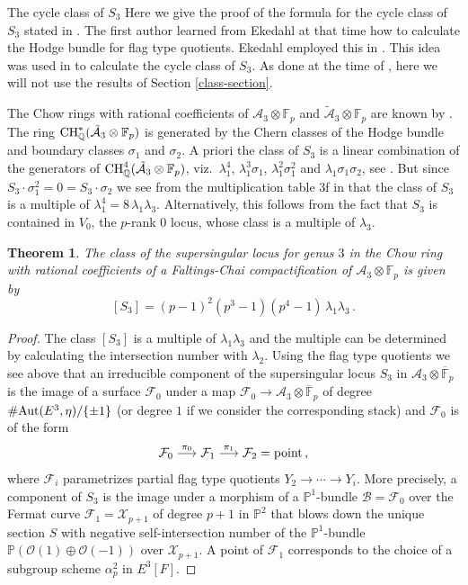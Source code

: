 \documentclass[11pt]{amsart}
\numberwithin{equation}{section}
\newcommand{\FF}{\mathbb F}
\newcommand{\PP}{\mathbb P}
\newcommand{\QQ}{\mathbb Q}
\newcommand{\A}{\mathcal A}
\newcommand\langepijl[1]{\buildrel {#1} \over \longrightarrow}
\newtheorem{theorem}{Theorem}[section]
\theoremstyle{definition}
\theoremstyle{remark}
\begin{document}
\begin{section}{The cycle class of $S_3$}
Here we give the proof of the formula for the cycle class of $S_3$
stated in \cite[Thm. 11.3]{vdG1}. The first author learned from Ekedahl at that time
how to calculate the Hodge bundle for flag type quotients. Ekedahl
employed this in \cite[Cor. 3.4]{Ekedahl1985}. This idea was used 
in \cite{vdG1} to calculate the cycle class of $S_3$. As done 
at the time of \cite{vdG1}, here we will not use the results of Section \ref{class-section}.

The Chow rings with rational coefficients
of ${\A}_3\otimes {\FF}_p$ and $\tilde{\A}_3\otimes {\FF}_p$ 
are known by \cite{vdG2}. The ring
${\rm CH}_{\QQ}^*(\tilde{\A}_3 \otimes {\FF}_p)$ is generated by the Chern classes
of the Hodge bundle and boundary classes $\sigma_1$ and $\sigma_2$.
A priori the class of $S_3$  is a linear
combination of the generators of ${\rm CH}_{\QQ}^4({\tilde{\A}_3\otimes {\FF}_p})$, viz.\
$\lambda_1^4$, $\lambda_1^3\sigma_1$,
$\lambda_1^2\sigma_1^2$ and $\lambda_1\sigma_1\sigma_2$, see \cite{vdG2}. But since
$S_3\cdot \sigma_1^2=0=S_3\cdot \sigma_2$ we see from the multiplication
table 3f in \cite[p.\ 765]{vdG2} that the class of
$S_3$ is a multiple of $\lambda_1^4=8\, \lambda_1\lambda_3$.
Alternatively, this follows from the fact that $S_3$ 
is contained in $V_0$,
the $p$-rank $0$ locus, whose class is a multiple of $\lambda_3$.

\begin{theorem}
The class of the supersingular locus for genus $3$  in the Chow ring
with rational coefficients of a Faltings-Chai compactification
of $\mathcal{A}_3\otimes {\FF}_p$ is given by
$$
[S_3]= (p-1)^2(p^3-1)(p^4-1) \, \lambda_1\lambda_3\, .
$$
\end{theorem}
\begin{proof}
The class  $[S_3]$  is a multiple of $\lambda_1\lambda_3$ and the multiple
can be determined by calculating the intersection number with $\lambda_2$.
Using the flag type quotients we see above that an irreducible component
of the supersingular locus $S_3$ in $\mathcal{A}_3\otimes \overline{\FF}_p$ 
is the image of a surface
$\mathcal{F}_0$ under a map $\mathcal{F}_0 \to \mathcal{A}_3 \otimes
\overline{\FF}_p$ 
of degree $\# {\rm Aut}(E^3,\eta)/\{ \pm 1 \}$  (or degree $1$ if we consider the corresponding stack)
and $\mathcal{F}_0$ is of the form
$$
\mathcal{F}_0 \langepijl{\pi_0}\mathcal{F}_1 \langepijl{\pi_1} \mathcal{F}_2={\rm point}\, ,
$$
where $\mathcal{F}_i$ parametrizes partial flag type quotients 
$Y_{2} \to \cdots \to Y_i$. More precisely, a component of $S_3$
is the image under a morphism of a ${\PP}^1$-bundle
$\mathcal{B}=\mathcal{F}_0$
over the Fermat curve $\mathcal{F}_1=\mathcal{X}_{p+1}$
of degree $p+1$ in ${\PP}^2$
that blows down the unique section $S$ 
with negative self-intersection number of the ${\PP}^1$-bundle
${\PP}(\mathcal{O}(1)\oplus \mathcal{O}(-1))$  over $\mathcal{X}_{p+1}$.
A point of $\mathcal{F}_1$ corresponds to the choice of a subgroup scheme $\alpha_p^2$
in $E^3[F]$.


\end{proof}
\end{section}
\end{document}
